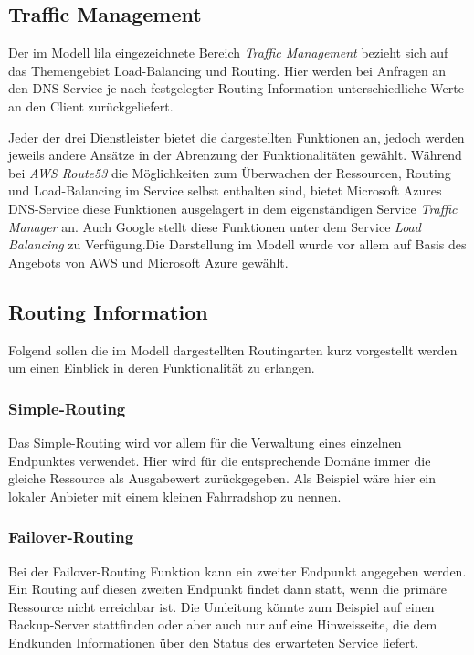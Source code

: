 \subsection{Traffic Management}
Der im Modell lila eingezeichnete Bereich \textit{Traffic Management} bezieht sich auf das Themengebiet Load-Balancing und Routing. Hier werden bei Anfragen an den DNS-Service je nach festgelegter Routing-Information unterschiedliche Werte an den Client zurückgeliefert. 

Jeder der drei Dienstleister bietet die dargestellten Funktionen an, jedoch werden jeweils andere Ansätze in der Abrenzung der Funktionalitäten gewählt. Während bei \textit{AWS Route53} die Möglichkeiten zum Überwachen der Ressourcen, Routing und Load-Balancing im Service selbst enthalten sind, bietet Microsoft Azures DNS-Service diese Funktionen ausgelagert in dem eigenständigen Service \textit{Traffic Manager} an. Auch Google stellt diese Funktionen unter dem Service \textit{Load Balancing} zu Verfügung.Die Darstellung im Modell wurde vor allem auf Basis des Angebots von AWS und Microsoft Azure gewählt.

\subsection{Routing Information}
Folgend sollen die im Modell dargestellten Routingarten kurz vorgestellt werden um einen Einblick in deren Funktionalität zu erlangen.

\subsubsection{Simple-Routing}
Das Simple-Routing wird vor allem für die Verwaltung eines einzelnen Endpunktes verwendet. Hier wird für die entsprechende Domäne immer die gleiche Ressource als Ausgabewert zurückgegeben. Als Beispiel wäre hier ein lokaler Anbieter mit einem kleinen Fahrradshop zu nennen.

\subsubsection{Failover-Routing}
Bei der Failover-Routing Funktion kann ein zweiter Endpunkt angegeben werden. Ein Routing auf diesen zweiten Endpunkt findet dann statt, wenn die primäre Ressource nicht erreichbar ist. Die Umleitung könnte zum Beispiel auf einen Backup-Server stattfinden oder aber auch nur auf eine Hinweisseite, die dem Endkunden Informationen über den Status des erwarteten Service liefert. 

